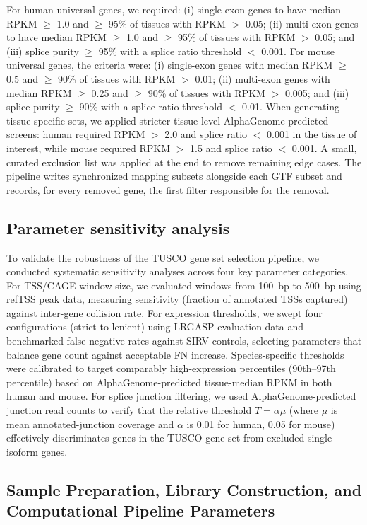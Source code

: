 \documentclass[pdflatex,sn-nature]{sn-jnl}%
\newcommand{\tuscoGeneSet}{TUSCO gene set}
\begin{document}
For human universal genes, we required: (i) single-exon genes to have median RPKM $\geq$ 1.0 and $\geq$ 95\% of tissues with RPKM $>$ 0.05; (ii) multi-exon genes to have median RPKM $\geq$ 1.0 and $\geq$ 95\% of tissues with RPKM $>$ 0.05; and (iii) splice purity $\geq$ 95\% with a splice ratio threshold $<$ 0.001. For mouse universal genes, the criteria were: (i) single-exon genes with median RPKM $\geq$ 0.5 and $\geq$ 90\% of tissues with RPKM $>$ 0.01; (ii) multi-exon genes with median RPKM $\geq$ 0.25 and $\geq$ 90\% of tissues with RPKM $>$ 0.005; and (iii) splice purity $\geq$ 90\% with a splice ratio threshold $<$ 0.01. When generating tissue-specific sets, we applied stricter tissue-level AlphaGenome-predicted screens: human required RPKM $>$ 2.0 and splice ratio $<$ 0.001 in the tissue of interest, while mouse required RPKM $>$ 1.5 and splice ratio $<$ 0.001. A small, curated exclusion list was applied at the end to remove remaining edge cases. The pipeline writes synchronized mapping subsets alongside each GTF subset and records, for every removed gene, the first filter responsible for the removal.

\subsection{Parameter sensitivity analysis}

To validate the robustness of the \tuscoGeneSet{} selection pipeline, we conducted systematic sensitivity analyses across four key parameter categories. For TSS/CAGE window size, we evaluated windows from 100~bp to 500~bp using refTSS peak data, measuring sensitivity (fraction of annotated TSSs captured) against inter-gene collision rate. For expression thresholds, we swept four configurations (strict to lenient) using LRGASP evaluation data and benchmarked false-negative rates against SIRV controls, selecting parameters that balance gene count against acceptable FN increase. Species-specific thresholds were calibrated to target comparably high-expression percentiles (90th--97th percentile) based on AlphaGenome-predicted tissue-median RPKM in both human and mouse. For splice junction filtering, we used AlphaGenome-predicted junction read counts to verify that the relative threshold $T = \alpha\mu$ (where $\mu$ is mean annotated-junction coverage and $\alpha$ is 0.01 for human, 0.05 for mouse) effectively discriminates genes in the \tuscoGeneSet{} from excluded single-isoform genes.

\subsection{Sample Preparation, Library Construction, and Computational Pipeline Parameters}
\end{document}
